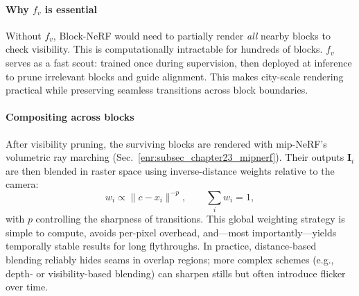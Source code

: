 \begin{enrichment}
\begin{enrichment}
         \paragraph{Why $f_v$ is essential}
         Without $f_v$, Block-NeRF would need to partially render \emph{all} nearby blocks to check visibility. This is computationally intractable for hundreds of blocks. $f_v$ serves as a fast scout: trained once during supervision, then deployed at inference to prune irrelevant blocks and guide alignment. This makes city-scale rendering practical while preserving seamless transitions across block boundaries.
         
         \paragraph{Compositing across blocks}
         After visibility pruning, the surviving blocks are rendered with mip-NeRF’s volumetric ray marching (Sec.~\ref{enr:subsec_chapter23_mipnerf}). Their outputs $\mathbf{I}_i$ are then blended in raster space using inverse-distance weights relative to the camera:
         \[
         w_i \propto \|c - x_i\|^{-p}, \qquad \sum_i w_i = 1,
         \]
         with $p$ controlling the sharpness of transitions. This global weighting strategy is simple to compute, avoids per-pixel overhead, and—most importantly—yields temporally stable results for long flythroughs. In practice, distance-based blending reliably hides seams in overlap regions; more complex schemes (e.g., depth- or visibility-based blending) can sharpen stills but often introduce flicker over time.
         

\end{enrichment}
\end{enrichment}
